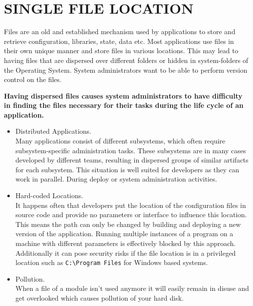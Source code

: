 \newpage
\section*{SINGLE FILE LOCATION}
Files are an old and established mechanism used by applications to store and retrieve configuration, libraries, state, data etc. Most applications use files in their own unique manner and store files in various locations. This may lead to having files that are dispersed over different folders or hidden in system-folders of the Operating System. System administrators  want to be able to perform version control on the files.
\begin{center}
  
\end{center}

\textbf{Having dispersed files causes system administrators to have difficulty in finding the files necessary for their tasks during the life cycle of an application.}\\

\begin{itemize}
\item Distributed Applications.\\
Many applications consist of different subsystems, which often require  subsystem-specific administration tasks. These subsystems are in many cases developed by different teams, resulting in dispersed groups of similar artifacts for each subsystem. This situation is well suited for developers as they can work in parallel. During deploy or system administration activities.
\item Hard-coded Locations.\\
It happens often that developers put the location of the configuration files in source code and provide no parameters or interface to influence this location. This means the path can only be changed by building and deploying a new version of the application. Running multiple instances of a program on a machine with different parameters is effectively blocked by this approach. Additionally it can pose security risks if the file location is in a privileged location such as \verb|C:\Program Files| for Windows based systems.
\item Pollution.\\
When a file of a module isn't used anymore it will easily remain in disuse and get overlooked which causes pollution of your hard disk.\\
\end{itemize}

